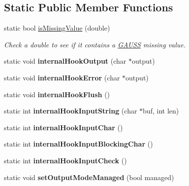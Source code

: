 \subsection*{Static Public Member Functions}
\begin{DoxyCompactItemize}
\item 
static bool \hyperlink{class_g_a_u_s_s_a3e665b3b7d0733f27ca56427e6ec3d49}{is\+Missing\+Value} (double)
\begin{DoxyCompactList}\small\item\em Check a double to see if it contains a \hyperlink{class_g_a_u_s_s}{G\+A\+U\+SS} missing value. \end{DoxyCompactList}\item 
\mbox{\label{class_g_a_u_s_s_ad907a936da9a60d342898b44bb37188c}} 
static void {\bfseries internal\+Hook\+Output} (char $\ast$output)
\item 
\mbox{\label{class_g_a_u_s_s_addc2a30c69243f368be14bee3ada1761}} 
static void {\bfseries internal\+Hook\+Error} (char $\ast$output)
\item 
\mbox{\label{class_g_a_u_s_s_a269ecd96318af60d348b650849d17c32}} 
static void {\bfseries internal\+Hook\+Flush} ()
\item 
\mbox{\label{class_g_a_u_s_s_ae9731be0762c7048f302be63c35827ce}} 
static int {\bfseries internal\+Hook\+Input\+String} (char $\ast$buf, int len)
\item 
\mbox{\label{class_g_a_u_s_s_a67e47c77b2937d46ca7369d7244a86fd}} 
static int {\bfseries internal\+Hook\+Input\+Char} ()
\item 
\mbox{\label{class_g_a_u_s_s_abda34d5de755c678c5789d736480df17}} 
static int {\bfseries internal\+Hook\+Input\+Blocking\+Char} ()
\item 
\mbox{\label{class_g_a_u_s_s_a24a9bde314967c81afed7a3cb150b94a}} 
static int {\bfseries internal\+Hook\+Input\+Check} ()
\item 
\mbox{\label{class_g_a_u_s_s_aae02638c0ed07f118b97a2e500ebf369}} 
static void {\bfseries set\+Output\+Mode\+Managed} (bool managed)

\end{DoxyCompactItemize}
